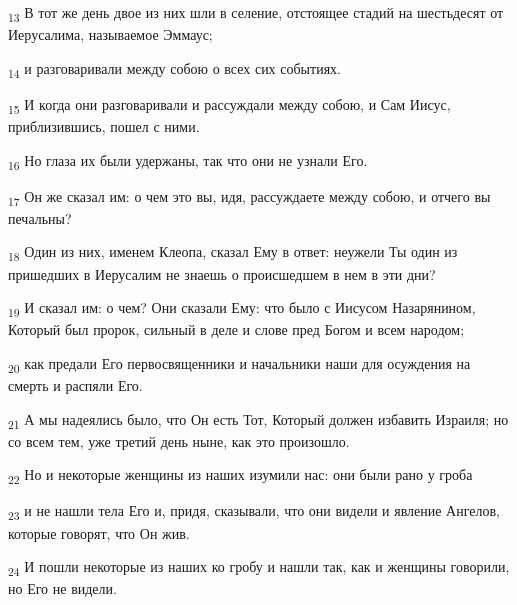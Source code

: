 \begin{tcolorbox}
\textsubscript{13} В тот же день двое из них шли в селение, отстоящее стадий на шестьдесят от Иерусалима, называемое Эммаус;
\end{tcolorbox}
\begin{tcolorbox}
\textsubscript{14} и разговаривали между собою о всех сих событиях.
\end{tcolorbox}
\begin{tcolorbox}
\textsubscript{15} И когда они разговаривали и рассуждали между собою, и Сам Иисус, приблизившись, пошел с ними.
\end{tcolorbox}
\begin{tcolorbox}
\textsubscript{16} Но глаза их были удержаны, так что они не узнали Его.
\end{tcolorbox}
\begin{tcolorbox}
\textsubscript{17} Он же сказал им: о чем это вы, идя, рассуждаете между собою, и отчего вы печальны?
\end{tcolorbox}
\begin{tcolorbox}
\textsubscript{18} Один из них, именем Клеопа, сказал Ему в ответ: неужели Ты один из пришедших в Иерусалим не знаешь о происшедшем в нем в эти дни?
\end{tcolorbox}
\begin{tcolorbox}
\textsubscript{19} И сказал им: о чем? Они сказали Ему: что было с Иисусом Назарянином, Который был пророк, сильный в деле и слове пред Богом и всем народом;
\end{tcolorbox}
\begin{tcolorbox}
\textsubscript{20} как предали Его первосвященники и начальники наши для осуждения на смерть и распяли Его.
\end{tcolorbox}
\begin{tcolorbox}
\textsubscript{21} А мы надеялись было, что Он есть Тот, Который должен избавить Израиля; но со всем тем, уже третий день ныне, как это произошло.
\end{tcolorbox}
\begin{tcolorbox}
\textsubscript{22} Но и некоторые женщины из наших изумили нас: они были рано у гроба
\end{tcolorbox}
\begin{tcolorbox}
\textsubscript{23} и не нашли тела Его и, придя, сказывали, что они видели и явление Ангелов, которые говорят, что Он жив.
\end{tcolorbox}
\begin{tcolorbox}
\textsubscript{24} И пошли некоторые из наших ко гробу и нашли так, как и женщины говорили, но Его не видели.
\end{tcolorbox}
